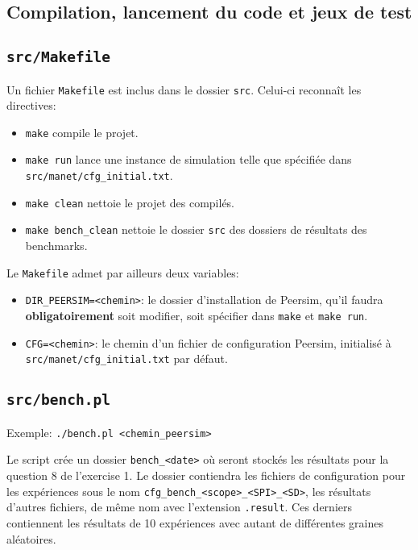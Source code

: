 \documentclass[a4paper]{article}
\begin{document}
\pagebreak
\begin{appendix}
  \section{Compilation, lancement du code et jeux de test}
  \subsection{\texttt{src/Makefile}}
    Un fichier \texttt{Makefile} est inclus dans le dossier
    \texttt{src}. Celui-ci reconnaît les directives:
    \begin{itemize}
    \item \texttt{make} compile le projet.
    \item \texttt{make run} lance une instance de simulation telle que
      spécifiée dans \texttt{src/manet/cfg\_initial.txt}.
    \item \texttt{make clean} nettoie le projet des compilés.
    \item \texttt{make bench\_clean} nettoie le dossier \texttt{src}
      des dossiers de résultats des benchmarks.\\
    \end{itemize}

    Le \texttt{Makefile} admet par ailleurs deux variables:
    \begin{itemize}
    \item \texttt{DIR\_PEERSIM=<chemin>}: le dossier d'installation de
      Peersim, qu'il faudra \textbf{obligatoirement} soit modifier,
      soit spécifier dans \texttt{make} et \texttt{make run}.
    \item \texttt{CFG=<chemin>}: le chemin d'un fichier de
      configuration Peersim, initialisé à \texttt{src/manet/cfg\_initial.txt} par défaut.
    \end{itemize}

    \subsection{\texttt{src/bench.pl}}
    Exemple: \texttt{./bench.pl <chemin\_peersim>}

    Le script crée un dossier \texttt{bench\_<date>} où seront stockés les
    résultats pour la question 8 de l'exercise 1. Le dossier contiendra
    les fichiers de configuration pour les expériences sous le nom
    \texttt{cfg\_bench\_<scope>\_<SPI>\_<SD>}, les résultats d'autres
    fichiers, de même nom avec l'extension \texttt{.result}. Ces derniers contiennent les résultats de 10 expériences avec autant de différentes graines aléatoires.


\end{appendix}
\end{document}
